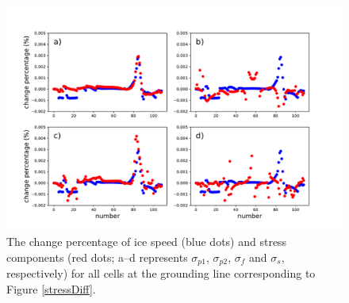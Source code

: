 \documentclass[review,oneside]{igs}
\begin{document}
\begin{figure}
	\centering
	\includegraphics[width=1\linewidth]{figs/diffStress_diffVel.pdf}
	\caption{The change percentage of ice speed (blue dots) and stress components (red dots; a--d represents $\sigma_{p1}$, $\sigma_{p2}$, $\sigma_{f}$ and $\sigma_{s}$, respectively) for all cells at the grounding line corresponding to Figure \ref{stressDiff}.}
	\label{stressDiff_velDiff}
\end{figure}
\end{document}
